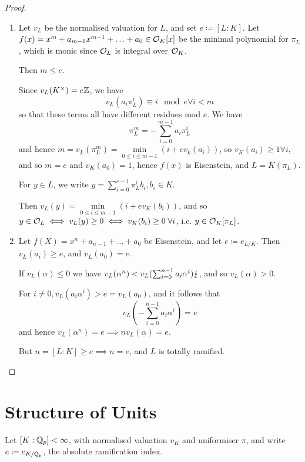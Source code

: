\documentclass[10pt,a4paper]{article}
\begin{document}
\begin{proof}\hspace*{0cm}
  \begin{enumerate}
    \item Let $v_L$ be the normalised valuation for $L$, and set $e \coloneqq [L:K]$. Let $f(x) = x^m+a_{m-1}x^{m-1}+\ldots + a_0 \in \mathcal{O}_K[x]$ be the minimal polynomial for $\pi_L$, which is monic since $\mathcal{O}_L$ is integral over $\mathcal{O}_K$.

    Then $m \leq e$.

    Since $v_L(K^\times) = e\mathbb{Z}$, we have
    \[v_L(a_i\pi_L^i) \equiv i \mod e \forall i <m\]
    so that these terms all have different residues mod $e$. We have
    \[\pi_L^m = -\sum_{i=0}^{m-1}a_i \pi_L^i\]
    and hence $m = v_L(\pi_L^m) = \min\limits_{0\leq i \leq m-1}(i+ev_k(a_i))$, so $v_K(a_i) \geq 1 \forall i$, and so $m=e$ and $v_K(a_0) = 1$, hence $f(x)$ is Eisenstein, and $L = K(\pi_L)$.

    For $y \in L$, we write $y = \sum_{i=0}^{e-1} \pi_L^i b_i, b_i \in K$.

    Then $v_L(y) = \min\limits_{0 \leq i \leq m-1} (i+ev_K(b_i))$, and so $y \in \O_L \iff v_L(y) \geq 0 \iff v_K(b_i) \geq 0 \forall i$, i.e. $y \in \mathcal{O}_K[\pi_L]$.

    \item Let $f(X) = x^n+a_{n-1} + \ldots + a_0$ be Eisenstein, and let $e \coloneqq e_{L/K}$. Then $v_L(a_i) \geq e$, and $v_L(a_0) = e$.

    If $v_L(\alpha) \leq 0$ we have $v_L(\alpha^n) < v_L(\sum_{i=0}^{n-1} a_i \alpha^i)\lightning$, and so $v_L(\alpha) > 0$.

    For $i \neq 0, v_L(a_i \alpha^i) > e = v_L(a_0)$, and it follows that
    \[v_L(-\sum_{i=0}^{n-1}a_i \alpha^i) = e\]
    and hence $v_L(\alpha^n) = e \implies nv_L(\alpha) = e$.

    But $n = [L:K] \geq e \implies n = e$, and $L$ is totally ramified.
  \end{enumerate}
\end{proof}
\section{Structure of Units}
Let $[K:\mathbb{Q}_p]<\infty$, with normalised valuation $v_K$ and uniformiser $\pi$, and write $e \coloneqq e_{K/\mathbb{Q}_p}$, the absolute ramification index.
\end{document}
